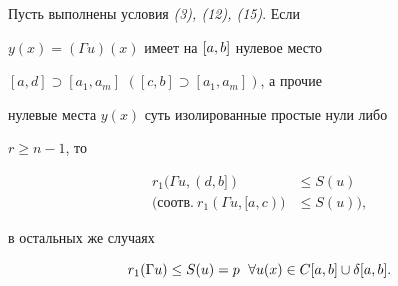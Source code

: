 \begin{lem}


Пусть выполнены условия {\em (3), (12), (15)}. Если


$y(x)=(\Gamma u)(x)$ имеет на $[a,b]$ нулевое место 


$[a,d]\supset[a_1,a_m]$  $([c,b]\supset[a_1,a_m])$, а прочие


нулевые места $y(x)$ суть изолированные простые нули либо 


$r\ge n-1$, то 


\begin{align}


r_1(\Gamma u,(d,b])&\le S(u)\\


\big(\text{соотв.}\ r_1(\Gamma u, [a,c))&\le S(u)\big),


\end{align}


в остальных же случаях 


\begin{equation}


r_1(\Gamma u)\le S(u)=p\ \; \forall u(x)\in C\ab\cup\delta\ab.


\end{equation}


\end{lem}








